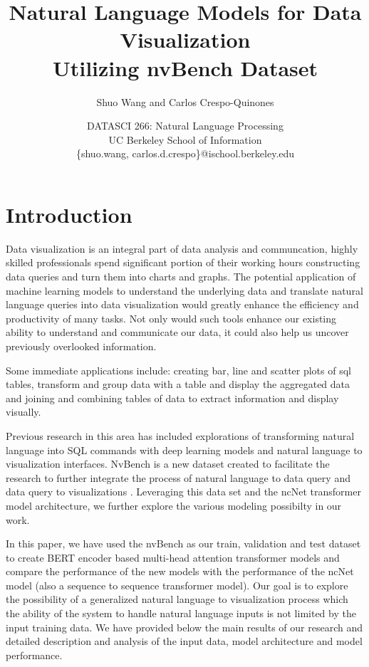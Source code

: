 \documentclass[
	a4paper, %
	10pt, %
	unnumberedsections, %
	twoside, %
]{t0003}
\title{Natural Language Models for Data Visualization\\ Utilizing nvBench Dataset} %
\author{
	Shuo Wang and Carlos Crespo-Quinones
}
\date{\footnotesize DATASCI 266: Natural Language Processing \\ UC Berkeley School of Information \\ \{shuo.wang, carlos.d.crespo\}@ischool.berkeley.edu}
\begin{document}
\maketitle %


\section{Introduction}

Data visualization is an integral part of data analysis and communcation, highly skilled professionals spend significant portion of their working hours constructing data queries and turn them into charts and graphs. The potential application of machine learning models to understand the underlying data and translate natural language queries into data visualization would greatly enhance the efficiency and productivity of many tasks. Not only would such tools enhance our existing ability to understand and communicate our data, it could also help us uncover previously overlooked information.

Some immediate applications include: creating bar, line and scatter plots of sql tables, transform and group data with a table and display the aggregated data and joining and combining tables of data to extract information and display visually.

Previous research in this area has included explorations of transforming natural language into SQL commands\cite{Zhong:2017qr, Yu:2019qr} with deep learning models and natural language to visualization interfaces\cite{Cox:2001qr}. NvBench is a new dataset created to facilitate the research to further integrate the process of natural language to data query and data query to visualizations\cite{Luo:2021qr} . Leveraging this data set and the ncNet transformer model architecture\cite{Luo:2022qr}, we further explore the various modeling possibilty in our work.

In this paper, we have used the nvBench as our train, validation and test dataset to create BERT encoder based multi-head attention transformer models and compare the performance of the new models with the performance of the ncNet model (also a sequence to sequence transformer model). Our goal is to explore the possibility of a generalized natural language to visualization process which the ability of the system to handle natural language inputs is not limited by the input training data. We have provided below the main results of our research and detailed description and analysis of the input data, model architecture and model performance.
\end{document}
